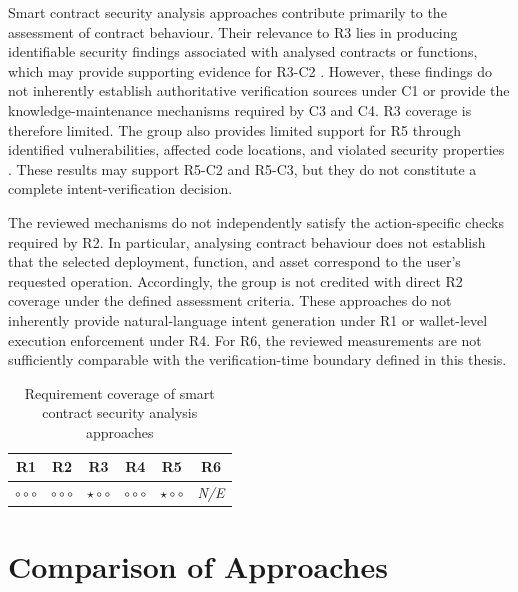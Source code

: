 Smart contract security analysis approaches contribute
primarily to the assessment of contract behaviour.
Their relevance to R3 lies in producing identifiable
security findings associated with analysed contracts
or functions, which may provide supporting evidence
for R3-C2
\cite{sunGPTScanDetectingLogic2023,
TODO_PropertyGPT}. However, these findings do not
inherently establish authoritative verification sources
under C1 or provide the knowledge-maintenance mechanisms
required by C3 and C4. R3 coverage is therefore limited. The group also provides limited support for R5 through
identified vulnerabilities, affected code locations,
and violated security properties
\cite{sunGPTScanDetectingLogic2023,
gaoLogicScanLLMDriven2026}. These results may support
R5-C2 and R5-C3, but they do not constitute a complete
intent-verification decision.

The reviewed mechanisms do not independently satisfy
the action-specific checks required by R2. In particular,
analysing contract behaviour does not establish that
the selected deployment, function, and asset correspond
to the user's requested operation. Accordingly, the
group is not credited with direct R2 coverage under
the defined assessment criteria. These approaches do not inherently provide natural-language
intent generation under R1 or wallet-level execution
enforcement under R4. For R6, the reviewed measurements
are not sufficiently comparable with the verification-time
boundary defined in this thesis.

\begin{table}[H]
\centering
\renewcommand{\arraystretch}{1.3}
\begin{tabular}{cccccc}
\hline
\textbf{R1} & \textbf{R2} & \textbf{R3} &
\textbf{R4} & \textbf{R5} & \textbf{R6} \\
\hline

$\circ\circ\circ$ &
$\circ\circ\circ$ &
$\star\circ\circ$ &
$\circ\circ\circ$ &
$\star\circ\circ$ &
\textit{N/E} \\

\hline
\end{tabular}
\caption{Requirement coverage of smart contract
security analysis approaches}
\label{tab:req_smart_contract_security}
\end{table}




\section{Comparison of Approaches}
\label{sec:sota_comparison}

